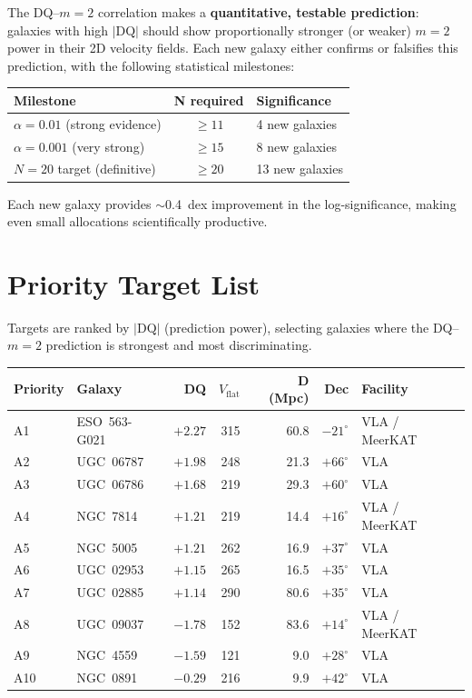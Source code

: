 \documentclass[11pt]{article}
\newcommand{\vflat}{V_\mathrm{flat}}
\newcommand{\DQ}{\mathrm{DQ}}
\newcommand{\mtwo}{m{=}2}
\begin{document}
The DQ--$\mtwo$ correlation makes a \textbf{quantitative, testable prediction}: galaxies with high $|\DQ|$ should show proportionally stronger (or weaker) $\mtwo$ power in their 2D velocity fields.
Each new galaxy either confirms or falsifies this prediction, with the following statistical milestones:

\begin{center}
\begin{tabular}{lcl}
\toprule
Milestone & N required & Significance \\
\midrule
$\alpha = 0.01$ (strong evidence) & $\geq 11$ & 4 new galaxies \\
$\alpha = 0.001$ (very strong) & $\geq 15$ & 8 new galaxies \\
$N = 20$ target (definitive) & $\geq 20$ & 13 new galaxies \\
\bottomrule
\end{tabular}
\end{center}

Each new galaxy provides $\sim$0.4~dex improvement in the log-significance, making even small allocations scientifically productive.

\section{Priority Target List}

Targets are ranked by $|\DQ|$ (prediction power), selecting galaxies where the DQ--$\mtwo$ prediction is strongest and most discriminating.

\begin{center}
\begin{tabular}{llrrrrl}
\toprule
Priority & Galaxy & DQ & $\vflat$ & D (Mpc) & Dec & Facility \\
\midrule
A1 & ESO~563-G021 & $+2.27$ & 315 & 60.8 & $-21^\circ$ & VLA / MeerKAT \\
A2 & UGC~06787 & $+1.98$ & 248 & 21.3 & $+66^\circ$ & VLA \\
A3 & UGC~06786 & $+1.68$ & 219 & 29.3 & $+60^\circ$ & VLA \\
A4 & NGC~7814 & $+1.21$ & 219 & 14.4 & $+16^\circ$ & VLA / MeerKAT \\
A5 & NGC~5005 & $+1.21$ & 262 & 16.9 & $+37^\circ$ & VLA \\
A6 & UGC~02953 & $+1.15$ & 265 & 16.5 & $+35^\circ$ & VLA \\
A7 & UGC~02885 & $+1.14$ & 290 & 80.6 & $+35^\circ$ & VLA \\
\midrule
A8 & UGC~09037 & $-1.78$ & 152 & 83.6 & $+14^\circ$ & VLA / MeerKAT \\
A9 & NGC~4559 & $-1.59$ & 121 & 9.0 & $+28^\circ$ & VLA \\
A10 & NGC~0891 & $-0.29$ & 216 & 9.9 & $+42^\circ$ & VLA \\
\bottomrule
\end{tabular}
\end{center}
\end{document}

